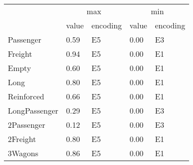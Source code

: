 \begin{tabular}{lllll}
\toprule
 & \multicolumn{2}{c}{max} & \multicolumn{2}{c}{min} \\
 & value & encoding & value & encoding \\
\midrule
Passenger & 0.59 & E5 & 0.00 & E3 \\
Freight & 0.94 & E5 & 0.00 & E1 \\
Empty & 0.60 & E5 & 0.00 & E1 \\
Long & 0.80 & E5 & 0.00 & E1 \\
Reinforced & 0.66 & E5 & 0.00 & E1 \\
LongPassenger & 0.29 & E5 & 0.00 & E3 \\
2Passenger & 0.12 & E5 & 0.00 & E3 \\
2Freight & 0.80 & E5 & 0.00 & E1 \\
3Wagons & 0.86 & E5 & 0.00 & E1 \\
\bottomrule
\end{tabular}
